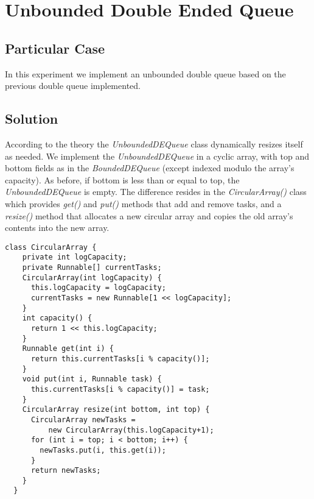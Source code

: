 


\section{\textbf{Unbounded Double Ended Queue}}



\subsection{Particular Case}
\par
In this experiment we implement an unbounded double queue based on the previous double queue implemented.
\par



\subsection{Solution}
\par
According to the theory the \textit{UnboundedDEQueue} class dynamically resizes itself as needed.
We implement the \textit{UnboundedDEQueue} in a cyclic array, with top and bottom fields as in the \textit{BoundedDEQueue} (except indexed modulo the array's capacity). As before, if bottom is less than or equal to top, the \textit{UnboundedDEQueue} is empty.
The difference resides in the \textit{CircularArray()} class which provides \textit{get()} and \textit{put()} methods that add and remove tasks, and a \textit{resize()} method that allocates a new circular array and copies the old array's contents into the new array.
\par
\begin{lstlisting}[frame=single,breaklines=true]
  class CircularArray {
    private int logCapacity;
    private Runnable[] currentTasks;
    CircularArray(int logCapacity) {
      this.logCapacity = logCapacity;
      currentTasks = new Runnable[1 << logCapacity];
    }
    int capacity() {
      return 1 << this.logCapacity;
    }
    Runnable get(int i) {
      return this.currentTasks[i % capacity()];
    }
    void put(int i, Runnable task) {
      this.currentTasks[i % capacity()] = task;
    }
    CircularArray resize(int bottom, int top) {
      CircularArray newTasks =
          new CircularArray(this.logCapacity+1);
      for (int i = top; i < bottom; i++) {
        newTasks.put(i, this.get(i));
      }
      return newTasks;
    }
  }
\end{lstlisting}


